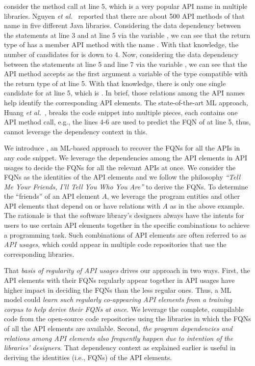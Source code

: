 consider the method call  at line 5, which is a very
popular API name in multiple libraries. Nguyen {\em et
  al.}~\cite{icse18} reported that there are about 500 API methods of
that name in five different Java libraries. Considering the data
dependency between the statements at line 3 and at line 5 via the
variable , we can see that the return type of
 has a member API method with the name .
With that knowledge, the number of candidates for  is
down to 4. Now, considering the data dependency between the statements
at line 5 and line 7 via the variable , we can see that the
API method  accepts as the first argument a
variable of the type compatible with the return type of 
at line 5. With that knowledge, there is only one single candidate for
 at line 5, which is
.
In brief, those relations among the API names help identify the
corresponding API elements. The state-of-the-art ML approach, Huang
{\em et al.}~\cite{prompt-ase22}, breaks the code snippet into
multiple pieces, each contains one API method call, e.g., the lines
4-6 are used to predict the FQN of  at line 5, thus,
cannot leverage the dependency context in this.


We introduce {\tool}, an ML-based approach to recover the FQNs for all
the APIs in any code snippet. We leverage the dependencies among the
API elements in API usages to decide the FQNs for all the relevant
APIs at once. We consider the FQNs as the identities of the API
elements and we follow the philosophy {\em ``Tell Me Your Friends,
  I'll Tell You Who You Are''} to derive the FQNs. To determine the
``friends'' of an API element $A$, we leverage the program entities
and other API elements that depend on or have relations with $A$ as in
the above example. The rationale is that the software library's
designers always have the intents for users to use certain API
elements together in the specific combinations to achieve a
programming task. Such combinations of API elements are often referred
to as {\em API usages}, which could appear in multiple code
repositories that use the corresponding libraries.


That {\em basis of regularity of API usages} drives our approach in
two ways. First, the API elements with their FQNs regularly appear
together in API usages have higher impact in deciding the FQNs than
the less regular ones. Thus, a ML model could {\em learn such
  regularly co-appearing API elements from a training corpus to help
  derive their FQNs at once}. We leverage the complete, compilable
code from the open-source code repositories using the libraries in
which the FQNs of all the API elements are available. Second, {\em the
  program dependencies and relations among API elements also
  frequently happen due to intention of the libraries' designers}.
That dependency context as explained earlier is useful in deriving the
identities (i.e., FQNs) of the API elements.

